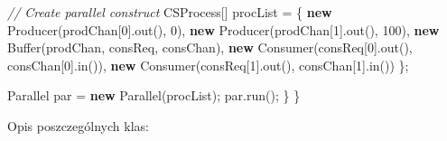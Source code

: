 \documentclass[11pt]{article}
\newenvironment{Shaded}{}{}
\newcommand{\KeywordTok}[1]{\textcolor[rgb]{0.00,0.44,0.13}{\textbf{{#1}}}}
\newcommand{\DecValTok}[1]{\textcolor[rgb]{0.25,0.63,0.44}{{#1}}}
\newcommand{\CommentTok}[1]{\textcolor[rgb]{0.38,0.63,0.69}{\textit{{#1}}}}
\newcommand{\FunctionTok}[1]{\textcolor[rgb]{0.02,0.16,0.49}{{#1}}}
\newcommand{\NormalTok}[1]{{#1}}
\newcommand{\OperatorTok}[1]{\textcolor[rgb]{0.40,0.40,0.40}{{#1}}}
\newcommand{\BuiltInTok}[1]{{#1}}
\begin{document}
\begin{Shaded}
\begin{Highlighting}[]
        \CommentTok{// Create parallel construct}
\NormalTok{        CSProcess}\OperatorTok{[]}\NormalTok{ procList }\OperatorTok{=} \OperatorTok{\{}
            \KeywordTok{new} \FunctionTok{Producer}\OperatorTok{(}\NormalTok{prodChan}\OperatorTok{[}\DecValTok{0}\OperatorTok{].}\FunctionTok{out}\OperatorTok{(),} \DecValTok{0}\OperatorTok{),}
            \KeywordTok{new} \FunctionTok{Producer}\OperatorTok{(}\NormalTok{prodChan}\OperatorTok{[}\DecValTok{1}\OperatorTok{].}\FunctionTok{out}\OperatorTok{(),} \DecValTok{100}\OperatorTok{),}
            \KeywordTok{new} \BuiltInTok{Buffer}\OperatorTok{(}\NormalTok{prodChan}\OperatorTok{,}\NormalTok{ consReq}\OperatorTok{,}\NormalTok{ consChan}\OperatorTok{),}
            \KeywordTok{new} \FunctionTok{Consumer}\OperatorTok{(}\NormalTok{consReq}\OperatorTok{[}\DecValTok{0}\OperatorTok{].}\FunctionTok{out}\OperatorTok{(),}\NormalTok{ consChan}\OperatorTok{[}\DecValTok{0}\OperatorTok{].}\FunctionTok{in}\OperatorTok{()),}
            \KeywordTok{new} \FunctionTok{Consumer}\OperatorTok{(}\NormalTok{consReq}\OperatorTok{[}\DecValTok{1}\OperatorTok{].}\FunctionTok{out}\OperatorTok{(),}\NormalTok{ consChan}\OperatorTok{[}\DecValTok{1}\OperatorTok{].}\FunctionTok{in}\OperatorTok{())}
        \OperatorTok{\};}

\NormalTok{        Parallel par }\OperatorTok{=} \KeywordTok{new} \FunctionTok{Parallel}\OperatorTok{(}\NormalTok{procList}\OperatorTok{);}
\NormalTok{        par}\OperatorTok{.}\FunctionTok{run}\OperatorTok{();}
    \OperatorTok{\}}
\OperatorTok{\}}
\end{Highlighting}
\end{Shaded}

    Opis poszczególnych klas:
\end{document}
